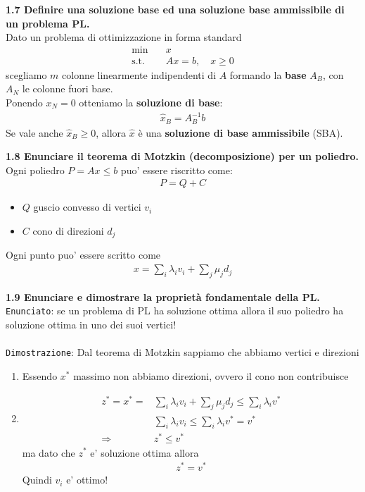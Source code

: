 \documentclass[a4paper,11pt]{article}
\newcommand{\domanda}[2]{%
  \vspace{0.6em}
  \noindent\textbf{#1}\\[0.2em]
  \noindent#2
  \vspace{1em}
  \par
}
\begin{document}
\domanda{1.7 \quad Definire una soluzione base ed una soluzione base ammissibile di un problema PL.}{
Dato un problema di ottimizzazione in forma standard
\begin{align*}
    \min \quad &x\\
    \text{s.t.} \quad &Ax = b, \quad x \geq 0
\end{align*}
scegliamo $m$ colonne linearmente indipendenti di $A$ formando la \textbf{base} $A_B$, con $A_N$ le colonne fuori base.\\
Ponendo $x_N = 0$ otteniamo la \textbf{soluzione di base}:
\begin{align*}
    \hat{x}_B = A^{-1}_B b
\end{align*}
Se vale anche $\hat{x}_B \geq 0$, allora $\hat{x}$ è una \textbf{soluzione di base ammissibile} (SBA).
}

\domanda{1.8 \quad Enunciare il teorema di Motzkin (decomposizione) per un poliedro.}{
Ogni poliedro $P=Ax\leq b$ puo' essere riscritto come:
\begin{align*}
    P=Q+C
\end{align*}
\begin{itemize}
    \item $Q$ guscio convesso di vertici $v_i$
    \item $C$ cono di direzioni $d_j$
\end{itemize}
Ogni punto puo' essere scritto come
\begin{align*}
    x = \sum_i \lambda_i v_i + \sum_j \mu_j d_j
\end{align*}
}

\domanda{1.9 \quad Enunciare e dimostrare la proprietà fondamentale della PL.}{
\texttt{Enunciato}: se un problema di PL ha soluzione ottima allora il suo poliedro ha soluzione ottima in uno dei suoi vertici!\\
\vspace{1px}\\
\texttt{Dimostrazione}: Dal teorema di Motzkin sappiamo che abbiamo vertici e direzioni
\begin{enumerate}
    \item Essendo $x^*$ massimo non abbiamo direzioni, ovvero il cono non contribuisce
    \item \begin{align*}
        z^* = x^* = &\sum_i \lambda_i v_i + \sum_j \mu_j d_j \leq \sum_i \lambda_i v^*\\
        &\sum_i \lambda_i v_i \leq \sum_i \lambda_i v^*=v^*\\
        \Rightarrow & z^* \leq v^*
    \end{align*}
    ma dato che $z^*$ e' soluzione ottima allora
    \begin{align*}
        z^* = v^*
    \end{align*}
    Quindi $v_i$ e' ottimo!
\end{enumerate}
}
\end{document}
